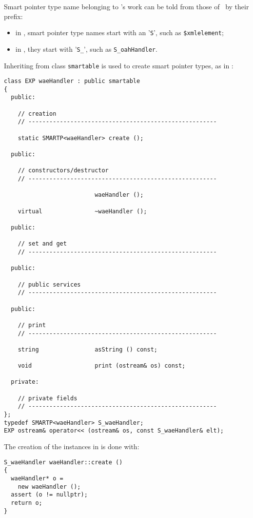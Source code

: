 Smart pointer type name belonging to \fober's work can be told from those of \mf\ by their prefix:
\begin{itemize}
\item  in \libmusicxml, smart pointer type names start with an '{\tt S}', such as {\tt \$xmlelement};
\item in \mf, they start with '{\tt S_}', such as {\tt S_oahHandler}.
\end{itemize}

Inheriting from class {\tt smartable} is used to create smart pointer types, as in :
\begin{lstlisting}[language=CPlusPlus]
class EXP waeHandler : public smartable
{
  public:

    // creation
    // ------------------------------------------------------

    static SMARTP<waeHandler> create ();

  public:

    // constructors/destructor
    // ------------------------------------------------------

                          waeHandler ();

    virtual               ~waeHandler ();

  public:

    // set and get
    // ------------------------------------------------------

  public:

    // public services
    // ------------------------------------------------------

  public:

    // print
    // ------------------------------------------------------

    string                asString () const;

    void                  print (ostream& os) const;

  private:

    // private fields
    // ------------------------------------------------------
};
typedef SMARTP<waeHandler> S_waeHandler;
EXP ostream& operator<< (ostream& os, const S_waeHandler& elt);
\end{lstlisting}

The creation of the instances in  is done with:
\begin{lstlisting}[language=CPlusPlus]
S_waeHandler waeHandler::create ()
{
  waeHandler* o =
    new waeHandler ();
  assert (o != nullptr);
  return o;
}
\end{lstlisting}


